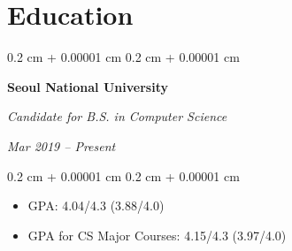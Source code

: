 \documentclass[10pt, letterpaper]{article}
\newenvironment{highlights}{
    \begin{itemize}[
        topsep=0.10 cm,
        parsep=0.10 cm,
        partopsep=0pt,
        itemsep=0pt,
        leftmargin=0.4 cm + 10pt
    ]
}{
    \end{itemize}
} %
\newenvironment{highlightsforbulletentries}{
    \begin{itemize}[
        topsep=0.10 cm,
        parsep=0.10 cm,
        partopsep=0pt,
        itemsep=0pt,
        leftmargin=10pt
    ]
}{
    \end{itemize}
} %
\newenvironment{onecolentry}{
    \begin{adjustwidth}{
        0.2 cm + 0.00001 cm
    }{
        0.2 cm + 0.00001 cm
    }
}{
    \end{adjustwidth}
} %
\newenvironment{twocolentry}[2][]{
    \onecolentry
    \def\secondColumn{#2}
    \setcolumnwidth{\fill, 4.5 cm}
    \begin{paracol}{2}
}{
    \switchcolumn \raggedleft \secondColumn
    \end{paracol}
    \endonecolentry
} %
\let\hrefWithoutArrow\href
\renewcommand{\href}[2]{\hrefWithoutArrow{#1}{\ifthenelse{\equal{#2}{}}{ }{#2 }\raisebox{.15ex}{\footnotesize \faExternalLink*}}}
\begin{document}

    










    \section{Education}
        
        \begin{twocolentry}{    
        \textit{Mar 2019 – Present}}
            \textbf{Seoul National University}

            \textit{Candidate for B.S. in Computer Science}
        \end{twocolentry}

        \vspace{0.10 cm}
        \begin{onecolentry}
            \begin{highlights}
                \item GPA: 4.04/4.3 (3.88/4.0)
                \item GPA for CS Major Courses: 4.15/4.3 (3.97/4.0)
            \end{highlights}
        \end{onecolentry}
\end{document}
